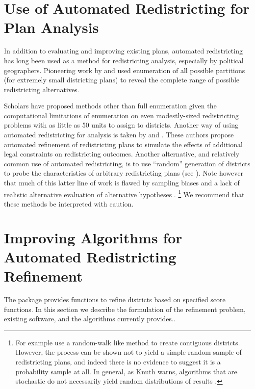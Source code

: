 \documentclass[article]{JSSstyle/jss}
\begin{document}
\section{Use of Automated Redistricting for Plan Analysis}

In addition to evaluating and improving existing plans, automated redistricting 
has long been used as a method for redistricting analysis, especially by political geographers.  Pioneering work by 
\citet{ShepJen70} and \citet{GudgTayl79} used enumeration of all 
possible partitions (for extremely small districting plans) to reveal the complete range of possible redistricting alternatives.  

Scholars have proposed methods other than full enumeration given the computational limitations of enumeration on even modestly-sized 
redistricting problems with as little as 50 units to assign to districts.  Another way of using automated redistricting for analysis is taken by \citet{Altman97} and \citet{RogersonYang99}. These authors propose 
automated refinement of redistricting plans to simulate the effects of additional legal constraints on redistricting outcomes.  Another alternative, 
and relatively common use of automated redistricting, is to use ``random'' generation of 
districts to probe the characteristics of arbitrary redistricting plans (see \citet{EngWild77,RosJohn81,Oloughlin82,Grofman82,CirDarOro00}). 
Note however that much of this latter line of work is flawed by sampling biases and a lack of realistic 
alternative evaluation of alternative hypotheses \citep{AltmanMcDonald04}. \footnote{For example
\citet[e.g.,]{CirDarOro00} use a random-walk like method to create contiguous districts. However, the process can be shown not to yield a simple random sample of redistricting plans, and indeed there is no evidence to suggest it is a probability sample at all.  In general, as Knuth warns, algorithms that are stochastic do not necessarily yield 
random distributions of results \citep[][]{Knuth97}. 
} We recommend that these methods be interpreted with caution.


\section{Improving Algorithms for Automated Redistricting Refinement} 

The  package provides functions to refine districts based on specified score functions. In this section we describe the formulation of the refinement problem, existing software, and the algorithms  currently provides..  
\end{document}
